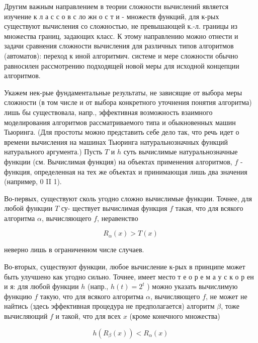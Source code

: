 \documentclass[10pt]{article}
\begin{document}
Другим важным направлением в теории сложности вычислений является изучение к л а с с о в с ло жн о с т и - множеств функций, для к-рых существуют вычисления со сложностью, не превышающей к.-л. границы из множества границ, задающих класс. К этому направлению можно отнести и задачи сравнения сложности вычисления для различных типов алгоритмов (автоматов): переход к иной алгоритмич. системе и мере сложности обычно равносилен рассмотрению подходящей новой меры для исходной концепции алгоритмов.



Укажем нек-рые фундаментальные результаты, не зависящие от выбора меры сложности (в том числе и от выбора конкретного уточнения понятия алгоритма) лишь бы существовала, напр., эффективная возможность взаимного моделирования алгоритмов рассматриваемого типа и обыкновенных машин Тьюринга. (Для простоты можно представить себе дело так, что речь идет о времени вычисления на машинах Тьюринга натуральнозначных функций натурального аргумента.) Пусть $T$ и $h$ суть вычислимые натуральнозначные функции (см. Вычислимая функция) на объектах применения алгоритмов, $f$ - функция, определенная на тех же объектах и принимающая лишь два значения (например, 0 II 1).



Во-первых, существуют сколь угодно сложно вычислимые функции. Точнее, для любой функции $T$ су- ществует вычислимая функция $f$ такая, что для всякого алгоритма $\alpha$, вычисляющего $f$, неравенство



\[

R_{\alpha}(x)>T(x)

\]



неверно лишь в ограниченном числе случаев.



Во-вторых, существуют функции, любое вычисление к-рых в принципе может быть улучшено как угодно сильно. Точнее, имеет место т е о р е м а у с к о р ен и я: для любой функции $h$ (напр., $h(t)=2^{t}$ ) можно указать вычислимую функцию $f$ такую, что для всякого алгоритма $\alpha$, вычисляющего $f$, не может не найтись (здесь эффективная процедура не предполагается) алгоритм $\beta$, тоже вычисляющий $f$ и такой, что для всех $x$ (кроме конечного множества)



\[

h\left(R_{\beta}(x)\right)<R_{\alpha}(x)

\]
\end{document}
